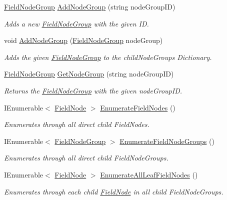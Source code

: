 \begin{DoxyCompactItemize}
\hyperlink{class_field_node_group}{Field\+Node\+Group} \hyperlink{class_field_node_group_a573db062478581073b88fff7c8f2c421}{Add\+Node\+Group} (string node\+Group\+ID)
\begin{DoxyCompactList}\small\item\em Adds a new \hyperlink{class_field_node_group}{Field\+Node\+Group} with the given ID. \end{DoxyCompactList}\item 
void \hyperlink{class_field_node_group_ade2f0d484ad7c38ac0000d1ea7ecf405}{Add\+Node\+Group} (\hyperlink{class_field_node_group}{Field\+Node\+Group} node\+Group)
\begin{DoxyCompactList}\small\item\em Adds the given \hyperlink{class_field_node_group}{Field\+Node\+Group} to the child\+Node\+Groups Dictionary. \end{DoxyCompactList}\item 
\hyperlink{class_field_node_group}{Field\+Node\+Group} \hyperlink{class_field_node_group_abe599247a37372fc997ad8bddb6dd6e1}{Get\+Node\+Group} (string node\+Group\+ID)
\begin{DoxyCompactList}\small\item\em Returns the \hyperlink{class_field_node_group}{Field\+Node\+Group} with the given node\+Group\+ID. \end{DoxyCompactList}\item 
I\+Enumerable$<$ \hyperlink{class_field_node}{Field\+Node} $>$ \hyperlink{class_field_node_group_a6ac9b5738d3f1931c01f2bd5bc4be5b5}{Enumerate\+Field\+Nodes} ()
\begin{DoxyCompactList}\small\item\em Enumerates through all direct child Field\+Nodes. \end{DoxyCompactList}\item 
I\+Enumerable$<$ \hyperlink{class_field_node_group}{Field\+Node\+Group} $>$ \hyperlink{class_field_node_group_a63bf1917f33f192088828c1c13991e63}{Enumerate\+Field\+Node\+Groups} ()
\begin{DoxyCompactList}\small\item\em Enumerates through all direct child Field\+Node\+Groups. \end{DoxyCompactList}\item 
I\+Enumerable$<$ \hyperlink{class_field_node}{Field\+Node} $>$ \hyperlink{class_field_node_group_a3451813e80e498e9614586b2480a7c1f}{Enumerate\+All\+Leaf\+Field\+Nodes} ()
\begin{DoxyCompactList}\small\item\em Enumerates through each child \hyperlink{class_field_node}{Field\+Node} in all child Field\+Node\+Groups. \end{DoxyCompactList}\end{DoxyCompactItemize}
